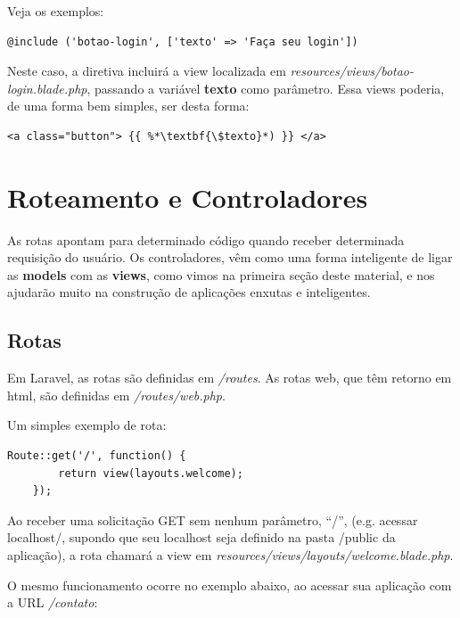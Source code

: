 \documentclass[
12pt,				%
openany,			%
twoside,			%
a4paper,			%
english,			%
french,				%
spanish,			%
brazil,				%
]{abntex2}
\begin{document}
\begin{itemize}
        Veja os exemplos:

        \begin{lstlisting}[style=common,caption={Passagem de parâmetro por @include}]
    @include ('botao-login', ['texto' => 'Faça seu login'])
\end{lstlisting}

Neste caso, a diretiva incluirá a view localizada em \textit{resources/views/botao-login.blade.php}, passando a variável \textbf{texto} como parâmetro. Essa views poderia, de uma forma bem simples, ser desta forma:

\begin{lstlisting}[style=common,caption={Correspondente ao \textit{isset()} em PHP puro}]
    <a class="button"> {{ %*\textbf{\$texto}*) }} </a>
\end{lstlisting}
\end{itemize}

\section{Roteamento e Controladores}
As rotas apontam para determinado código quando receber determinada requisição do
usuário. Os controladores, vêm como uma forma inteligente de ligar as \textbf{models} com as \textbf{views},
como vimos na primeira seção deste material, e nos ajudarão muito na construção de
aplicações enxutas e inteligentes.

\subsection{Rotas}
Em Laravel, as rotas são definidas em \textit{/routes}. As rotas web, que têm retorno em html, são definidas em \textit{/routes/web.php}.

Um simples exemplo de rota:

\begin{lstlisting}[style=php,caption={\textit{/routes/web.php}}]
    Route::get('/', function() {
        return view(layouts.welcome);
    });
\end{lstlisting}

Ao receber uma solicitação GET sem nenhum parâmetro, “/”, (e.g. acessar localhost/, supondo
que seu localhost seja definido na pasta /public da aplicação), a rota chamará a view em
\textit{resources/views/layouts/welcome.blade.php}.

O mesmo funcionamento ocorre no exemplo abaixo, ao acessar sua aplicação com a URL \textit{/contato}:
\end{document}
